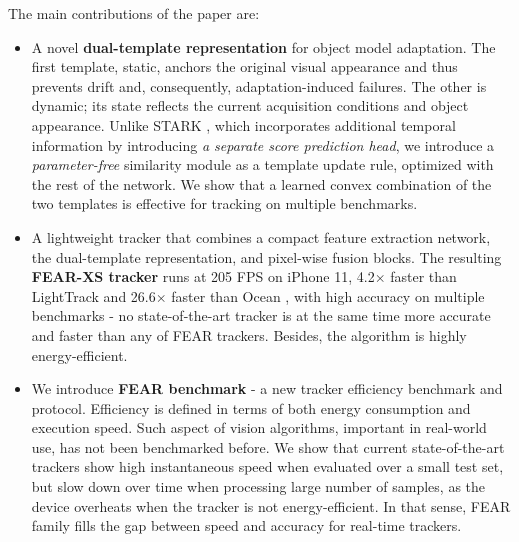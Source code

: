 \documentclass[runningheads]{llncs}
\begin{document}
The main contributions of the paper are:
\begin{itemize}


\item  A novel \textbf{dual-template representation} for object model adaptation.
The first template, static, anchors the original visual appearance
and thus prevents drift and, consequently, adaptation-induced failures.
The other is dynamic; its state reflects the current acquisition conditions and object appearance. 
Unlike STARK \cite{STARK}, which incorporates additional temporal information by introducing \textit{a separate score prediction head}, we introduce a \textit{parameter-free} similarity module as a template update rule, optimized with the rest of the network.
We show that a learned convex combination of the two templates is effective for tracking on multiple benchmarks.





\item  A lightweight tracker that combines a compact feature extraction network, the dual-template representation, and pixel-wise fusion blocks.
The resulting {\bf FEAR-XS tracker} runs at 205 FPS on iPhone 11, 4.2$\times$ faster than LightTrack \cite{LightTrack} and 26.6$\times$ faster than Ocean \cite{Ocean}, with high accuracy on multiple benchmarks - no state-of-the-art tracker is at the same time more accurate and faster than any of FEAR trackers. Besides, the algorithm is highly energy-efficient.
    
    
\item We introduce \textbf{FEAR benchmark} - a new tracker efficiency benchmark and protocol. Efficiency is defined in terms of both energy consumption and execution speed.
Such aspect of vision algorithms, important in real-world use, has not been benchmarked before. 
We show that current state-of-the-art trackers show high instantaneous speed when evaluated over a small test set, but slow down over time when processing large number of samples, as the device overheats when the tracker is not energy-efficient.
In that sense, FEAR family fills the gap between speed and accuracy for real-time trackers.
\end{itemize}
\end{document}
